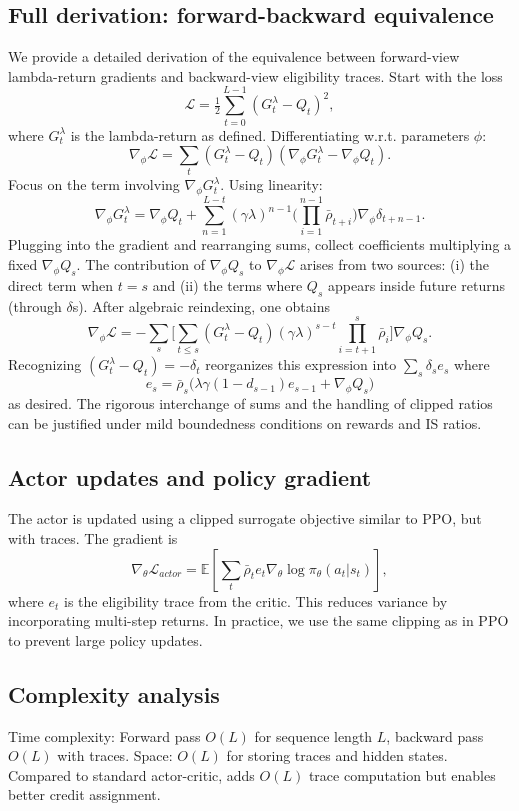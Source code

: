 \documentclass{article}
\begin{document}
\subsection{Full derivation: forward-backward equivalence}
We provide a detailed derivation of the equivalence between forward-view lambda-return gradients and backward-view eligibility traces. Start with the loss
\[
\mathcal{L} = \tfrac12 \sum_{t=0}^{L-1} (G_t^{\lambda} - Q_t)^2,
\]
where \(G_t^{\lambda}\) is the lambda-return as defined. Differentiating w.r.t. parameters \(\phi\):
\[
\nabla_\phi \mathcal{L} = \sum_t (G_t^{\lambda} - Q_t) (\nabla_\phi G_t^{\lambda} - \nabla_\phi Q_t).
\]
Focus on the term involving \(\nabla_\phi G_t^{\lambda}\). Using linearity:
\[
\nabla_\phi G_t^{\lambda} = \nabla_\phi Q_t + \sum_{n=1}^{L-t} (\gamma\lambda)^{n-1} \Big(\prod_{i=1}^{n-1} \bar{\rho}_{t+i}\Big) \nabla_\phi \delta_{t+n-1}.
\]
Plugging into the gradient and rearranging sums, collect coefficients multiplying a
fixed \(\nabla_\phi Q_s\). The contribution of \(\nabla_\phi Q_s\) to \(\nabla_\phi \mathcal{L}\) arises from two sources: (i) the direct term when \(t=s\) and (ii) the terms where \(Q_s\) appears inside future returns (through \(\delta\)s). After algebraic reindexing,
one obtains
\[
\nabla_\phi \mathcal{L} = -\sum_s \Big[ \sum_{t\le s} (G_t^{\lambda} - Q_t) (\gamma\lambda)^{s-t} \prod_{i=t+1}^{s} \bar{\rho}_i \Big] \nabla_\phi Q_s.
\]
Recognizing \((G_t^{\lambda} - Q_t) = -\delta_t\) reorganizes this expression into
\(\sum_s \delta_s e_s\) where
\[
e_s = \bar{\rho}_s \big(\lambda\gamma (1-d_{s-1}) e_{s-1} + \nabla_\phi Q_s\big)
\]
as desired. The rigorous interchange of sums and the handling of clipped ratios can
be justified under mild boundedness conditions on rewards and IS ratios.

\subsection{Actor updates and policy gradient}
The actor is updated using a clipped surrogate objective similar to PPO, but with traces. The gradient is
\[
\nabla_\theta \mathcal{L}_{actor} = \mathbb{E} \left[ \sum_t \bar{\rho}_t e_t \nabla_\theta \log \pi_\theta(a_t|s_t) \right],
\]
where \(e_t\) is the eligibility trace from the critic. This reduces variance by incorporating multi-step returns. In practice, we use the same clipping as in PPO to prevent large policy updates.

\subsection{Complexity analysis}
Time complexity: Forward pass \(O(L)\) for sequence length \(L\), backward pass \(O(L)\) with traces. Space: \(O(L)\) for storing traces and hidden states. Compared to standard actor-critic, adds \(O(L)\) trace computation but enables better credit assignment.
\end{document}
